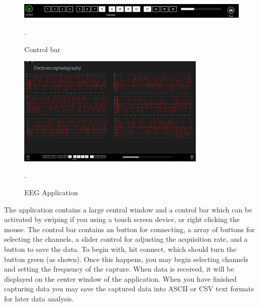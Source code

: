 \documentclass[]{article}
\begin{document}
\begin{figure}[H]
	\begin{center}
		\includegraphics[width = \textwidth]{control}
	\end{center}
	\caption{Control bar}. 
	\label{fig:control}
\end{figure}

\begin{figure}[H]
	\begin{center}
		\includegraphics[width = 0.8\textwidth]{exampleapp}
	\end{center}
	\caption{\ac{EEG} Application}. 
	\label{fig:exampleappuguide}
\end{figure}


The application contains a large central window and a control bar which can be activated by swiping if you using a touch screen device, or right clicking the mouse. The control bar contains an button for connecting, a array of buttons for selecting the channels, a slider control for adjusting the acquisition rate, and a button to save the data. To begin with, hit connect, which should turn the button green (as shown). Once this happens, you may begin selecting channels and setting the frequency of the capture. When data is received, it will be displayed on the center window of the application. When you have finished capturing data you may save the captured data into ASCII or CSV text formats for later data analysis. 
\end{document}
